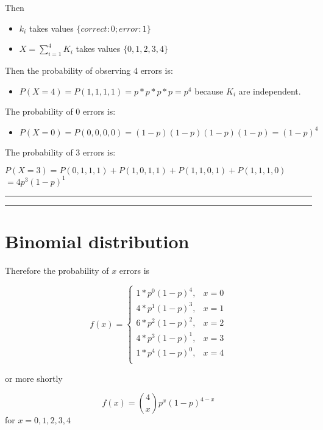 \documentclass[
]{book}
\providecommand{\tightlist}{%
  \setlength{\itemsep}{0pt}\setlength{\parskip}{0pt}}
\begin{document}
Then

\begin{itemize}
\item
  \(k_i\) takes values \(\{correct:0; error:1\}\)
\item
  \(X=\sum_{i=1}^4 K_i\) takes values \(\{0,1,2,3,4\}\)
\end{itemize}

Then the probability of observing \(4\) errors is:

\begin{itemize}
\tightlist
\item
  \(P(X=4)=P(1,1,1,1)=p*p*p*p=p^4\) because \(K_i\) are independent.
\end{itemize}

The probability of \(0\) errors is:

\begin{itemize}
\tightlist
\item
  \(P(X=0)=P(0,0,0,0)=(1-p)(1-p)(1-p)(1-p)=(1-p)^4\)
\end{itemize}

The probability of \(3\) errors is:

\(P(X=3)=P(0,1,1,1)+P(1,0,1,1)+P(1,1,0,1)+P(1,1,1,0)\)
\(=4p^3(1-p)^1\)

\begin{center}\rule{0.5\linewidth}{0.5pt}\end{center}

\begin{center}\rule{0.5\linewidth}{0.5pt}\end{center}

\hypertarget{binomial-distribution-2}{%
\section{Binomial distribution}\label{binomial-distribution-2}}

Therefore the probability of \(x\) errors is

\[
    f(x)= 
\begin{cases}
    1*p^0(1-p)^4,&  x=0 \\
    4*p^1(1-p)^3,&  x=1 \\
    6*p^2(1-p)^2,&  x=2 \\
    4*p^3(1-p)^1,&  x=3 \\
    1*p^4(1-p)^0,&  x=4 \\
\end{cases}
\]

or more shortly

\[f(x)=\binom 4 x p^x(1-p)^{4-x}\]
for \(x=0,1,2,3,4\)
\end{document}
